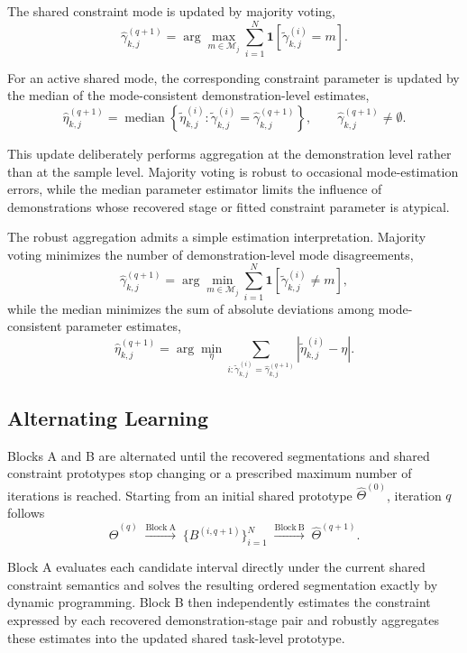 \documentclass[lettersize,journal]{IEEEtran}
\begin{document}
The shared constraint mode is updated by majority voting,
\[
\widehat{\gamma}_{k,j}^{(q+1)}
=
\arg\max_{m\in\mathcal{M}_j}
\sum_{i=1}^{N}
\mathbf{1}
\left[
\widetilde{\gamma}_{k,j}^{(i)}
=
m
\right].
\]

For an active shared mode, the corresponding constraint parameter is updated by the median of the mode-consistent demonstration-level estimates,
\[
\widehat{\eta}_{k,j}^{(q+1)}
=
\operatorname{median}
\left\{
\widetilde{\eta}_{k,j}^{(i)}
:
\widetilde{\gamma}_{k,j}^{(i)}
=
\widehat{\gamma}_{k,j}^{(q+1)}
\right\},
\qquad
\widehat{\gamma}_{k,j}^{(q+1)}
\neq
\emptyset.
\]

This update deliberately performs aggregation at the demonstration level rather than at the sample level. Majority voting is robust to occasional mode-estimation errors, while the median parameter estimator limits the influence of demonstrations whose recovered stage or fitted constraint parameter is atypical.

The robust aggregation admits a simple estimation interpretation. Majority voting minimizes the number of demonstration-level mode disagreements,
\[
\widehat{\gamma}_{k,j}^{(q+1)}
=
\arg\min_{m\in\mathcal{M}_j}
\sum_{i=1}^{N}
\mathbf{1}
\left[
\widetilde{\gamma}_{k,j}^{(i)}
\neq
m
\right],
\]
while the median minimizes the sum of absolute deviations among mode-consistent parameter estimates,
\[
\widehat{\eta}_{k,j}^{(q+1)}
=
\arg\min_{\eta}
\sum_{i:
\widetilde{\gamma}_{k,j}^{(i)}
=
\widehat{\gamma}_{k,j}^{(q+1)}
}
\left|
\widetilde{\eta}_{k,j}^{(i)}
-
\eta
\right|.
\]

\subsection{Alternating Learning}

Blocks A and B are alternated until the recovered segmentations and shared constraint prototypes stop changing or a prescribed maximum number of iterations is reached. Starting from an initial shared prototype $\widehat{\Theta}^{(0)}$, iteration $q$ follows
\[
\widehat{\Theta}^{(q)}
\;\xrightarrow{\mathrm{Block~A}}\;
\{B^{(i,q+1)}\}_{i=1}^{N}
\;\xrightarrow{\mathrm{Block~B}}\;
\widehat{\Theta}^{(q+1)}.
\]

Block A evaluates each candidate interval directly under the current shared constraint semantics and solves the resulting ordered segmentation exactly by dynamic programming. Block B then independently estimates the constraint expressed by each recovered demonstration-stage pair and robustly aggregates these estimates into the updated shared task-level prototype.
\end{document}
